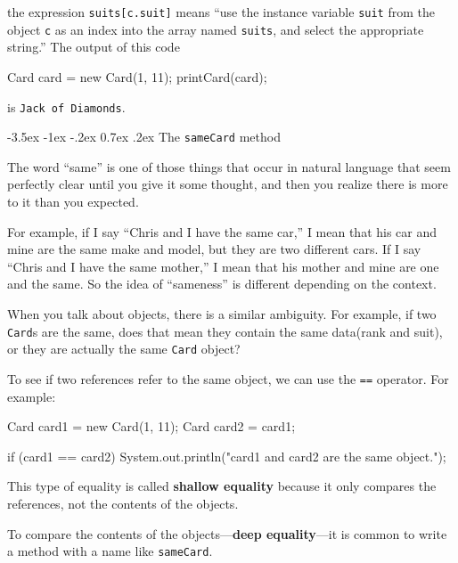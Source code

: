 \documentclass{book}
\makeatletter
\renewcommand{\section}{\@startsection 
    {section} {1} {0mm}%
    {-3.5ex \@plus -1ex \@minus -.2ex}%
    {0.7ex \@plus.2ex}%
    {\normalfont\Large\bfseries}}
\makeatother
\begin{document}
the expression {\tt suits[c.suit]} means ``use the instance variable
{\tt suit} from the object {\tt c} as an index into the array named
{\tt suits}, and select the appropriate string.''  The output of this
code

\begin{verbatimtab}
    Card card = new Card(1, 11);
    printCard(card);
\end{verbatimtab}
%
is {\tt Jack of Diamonds}.

\section{The {\tt sameCard} method}

The word ``same'' is one of those things that occur in natural
language that seem perfectly clear until you give it some thought,
and then you realize there is more to it than you expected.


For example, if I say ``Chris and I have the same car,'' I
mean that his car and mine are the same make and model, but they are
two different cars.  If I say ``Chris and I have the same mother,'' I
mean that his mother and mine are one and the same.  So the
idea of ``sameness'' is different depending on the context.

When you talk about objects, there is a similar ambiguity.  For
example, if two {\tt Card}s are the same, does that mean they
contain the same data(rank and suit), or they are actually
the same {\tt Card} object?

To see if two references refer to the same object, we can use
the {\tt ==} operator.  For example:

\begin{verbatimtab}
    Card card1 = new Card(1, 11);
    Card card2 = card1;

    if (card1 == card2) {
        System.out.println("card1 and card2 are the same object.");
    }
\end{verbatimtab}
%
This type of equality is called {\bf shallow equality} because
it only compares the references, not the contents of the objects.


To compare the contents of the objects---{\bf deep equality}---it
is common to write a method with a name like {\tt sameCard}.
\end{document}
